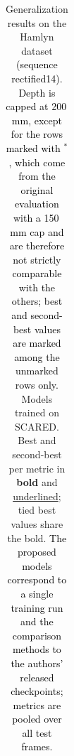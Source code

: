 \documentclass[a4paper,fleqn]{cas-dc}
\begin{document}
{\begin{table}[!hbt]
\begin{tabular}{clccccccc}
\bottomrule
\end{tabular}
\caption{Generalization results on the Hamlyn dataset \textcolor{black}{(sequence rectified14). Depth is capped at 200\,mm, except for the rows marked with $^{\ast}$, which come from the original evaluation with a 150\,mm cap and are therefore not strictly comparable with the others; best and second-best values are marked among the unmarked rows only.} 
Models trained on SCARED. Best and second-best 
per metric in \textbf{bold} and \underline{underlined}; tied best values share the bold. \textcolor{black}{The proposed models correspond to a single training run and the comparison methods to the authors' released checkpoints; metrics are pooled over all test frames.}}
\label{tab:quant_hamlyn}
\end{table}


}
\end{document}

